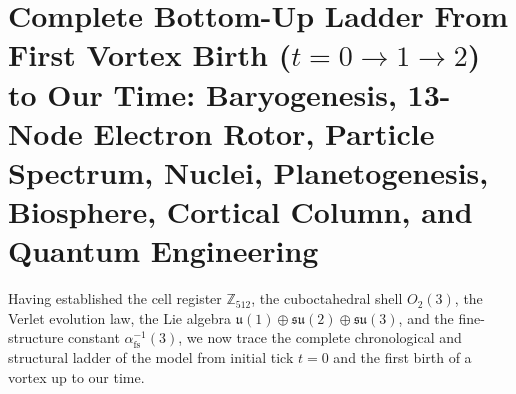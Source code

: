 \documentclass[11pt,a4paper]{article}
\theoremstyle{plain}
\theoremstyle{definition}
\begin{document}
\section{Complete Bottom-Up Ladder From First Vortex Birth (\texorpdfstring{$t = 0 \to 1 \to 2$}{t = 0 -> 1 -> 2}) to Our Time: Baryogenesis, 13-Node Electron Rotor, Particle Spectrum, Nuclei, Planetogenesis, Biosphere, Cortical Column, and Quantum Engineering}
\label{sec:complete-bottom-up-ladder}

Having established the cell register $\mathbb{Z}_{512}$, the cuboctahedral shell $O_2(3)$, the Verlet evolution law, the Lie algebra $\mathfrak{u}(1)\oplus\mathfrak{su}(2)\oplus\mathfrak{su}(3)$, and the fine-structure constant $\alpha_{\mathrm{fs}}^{-1}(3)$, we now trace the complete chronological and structural ladder of the model from initial tick $t = 0$ and the first birth of a vortex up to our time.
\end{document}

